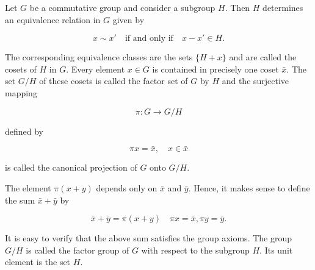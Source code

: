 Let $G$ be a commutative group and consider a subgroup $H$. Then $H$ determines an equivalence relation in $G$ given by

$$x \sim x' \quad \text{if and only if} \quad x - x' \in H.$$

The corresponding equivalence classes are the sets $\{H + x\}$ and are called the cosets of $H$ in $G$. Every element $x \in G$ is contained in precisely one coset $\bar{x}$. The set $G/H$ of these cosets is called the factor set of $G$ by $H$ and the surjective mapping

$$\pi: G \rightarrow G/H$$

defined by

$$\pi x = \bar{x}, \quad x \in \bar{x}$$

is called the canonical projection of $G$ onto $G/H$.

The element $\pi(x+y)$ depends only on $\bar{x}$ and $\bar{y}$. Hence, it makes sense to define the sum $\bar{x} + \bar{y}$ by

$$\bar{x} + \bar{y} = \pi(x + y) \quad \pi x = \bar{x}, \pi y = \bar{y}.$$

It is easy to verify that the above sum satisfies the group axioms. The group $G/H$ is called the factor group of $G$ with respect to the subgroup $H$. Its unit element is the set $H$.
